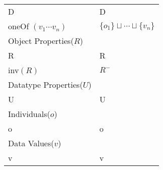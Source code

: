 \begin{table}[h]
\begin{tabular}{|p{10cm}|p{5cm}|}
			\hline
			D & D\\
			oneOf $(v_{1} \cdots v_{n})$ & $\{o_{1}\} \sqcup \cdots \sqcup \{v_{n}\}$\\
			\hline
			Object Properties($R$) & {}\\
			\hline
			R & R\\
			inv$(R)$ & $R^{-}$\\
			\hline
			\hline
			Datatype Properties($U$) & {}\\
			\hline
			U & U\\
			\hline
			\hline
			Individuals($o$) & {}\\
			\hline
			o & o\\
			\hline
			\hline
			Data Values($v$) & {}\\
			\hline
			v & v\\
			\hline
		\end{tabular}
\label{tab:OWLvsDL}
\end{table}
